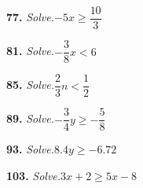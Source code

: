 \documentclass{ximera}
\begin{document}
\begin{problem}
\textbf{77.} \emph{Solve.}\quad $-5x \ge \dfrac{10}{3}$

\begin{multipleChoice}
\end{multipleChoice}
\end{problem}

\begin{problem}
\textbf{81.} \emph{Solve.}\quad $-\dfrac{3}{8}x < 6$

\begin{multipleChoice}
\end{multipleChoice}
\end{problem}

\begin{problem}
\textbf{85.} \emph{Solve.}\quad $\dfrac{2}{3}n < \dfrac{1}{2}$

\begin{multipleChoice}
\end{multipleChoice}
\end{problem}

\begin{problem}
\textbf{89.} \emph{Solve.}\quad $-\dfrac{3}{4}y \ge -\dfrac{5}{8}$

\begin{multipleChoice}
\end{multipleChoice}
\end{problem}

\begin{problem}
\textbf{93.} \emph{Solve.}\quad $8.4y \ge -6.72$

\begin{multipleChoice}
\end{multipleChoice}
\end{problem}

\begin{problem}
\textbf{103.} \emph{Solve.}\quad $3x + 2 \ge 5x - 8$

\begin{multipleChoice}
\end{multipleChoice}
\end{problem}
\end{document}
